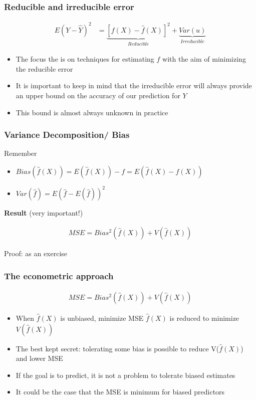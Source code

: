 \documentclass[
  shownotes,
  xcolor={svgnames},
  hyperref={colorlinks,citecolor=DarkBlue,linkcolor=DarkRed,urlcolor=DarkBlue}
  ]{beamer}
\begin{document}
\begin{frame}
\frametitle{Reducible and irreducible error}

\begin{align}
E(Y-\hat Y)^2  &= \underset{Reducible}{\underbrace{[f(X)-\hat{f}(X)]^{2}}}+\underset{Irreducible}{\underbrace{Var(u)}}
\end{align}
\bigskip
\begin{itemize}
\item The focus the is on techniques for estimating $f$ with the aim of minimizing the reducible error
\medskip
\item It is important to keep in mind that the irreducible error will always provide an upper bound on the accuracy of our prediction for $Y$
\medskip
\item This bound is almost always unknown in practice
\end{itemize}

\end{frame}

\begin{frame}
\frametitle{Variance Decomposition/ Bias}

Remember
\begin{itemize}
  \item $Bias (\hat f(X) )=E (\hat f(X) )-f=E (\hat f(X)-f(X))$
  \item  $Var (\hat f)  =E (\hat f - E (\hat f))^2$
\end{itemize}  

\bigskip
{\bf Result} (very important!)
\bigskip

\begin{align}
  MSE = Bias^2 (\hat f(X))+V (\hat f(X)) 
\end{align}

{\tiny Proof: as an exercise}

\end{frame}

\begin{frame}
\frametitle{The econometric approach}

\begin{align}
MSE = Bias^2 (\hat f(X))+V (\hat f(X)) 
\end{align}

\bigskip

\begin{itemize}
  \item  When $\hat f(X)$ is unbiased, minimize MSE $\hat f(X)$ is reduced to minimize  $V(\hat f(X))$
  \medskip
  \item The best kept secret: tolerating some bias is possible to reduce V($\hat f(X)$) and lower MSE
  \medskip
  \item  If the goal is to predict, it is not a problem to tolerate biased estimates
  \medskip
  \item  It could be the case that the MSE is minimum for biased predictors
\end{itemize}
\end{frame}
\end{document}
